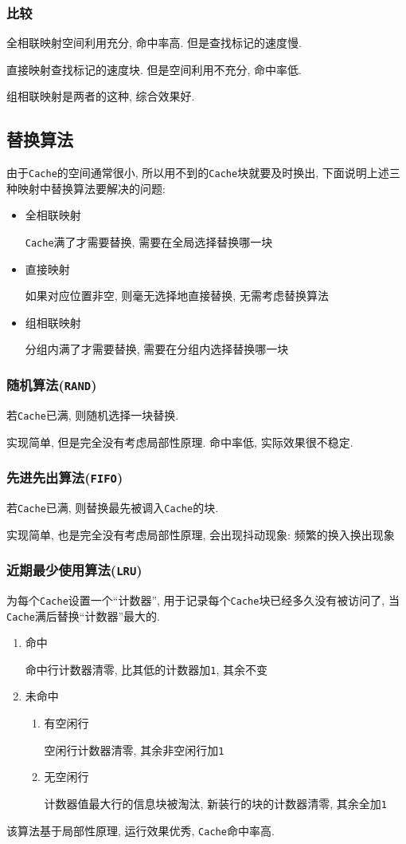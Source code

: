 \subsubsection{比较}
全相联映射空间利用充分, 命中率高. 但是查找标记的速度慢.\par
直接映射查找标记的速度块. 但是空间利用不充分, 命中率低.\par
组相联映射是两者的这种, 综合效果好.
\subsection{替换算法}
由于\verb|Cache|的空间通常很小, 所以用不到的\verb|Cache|块就要及时换出, 下面说明上述三种映射中替换算法要解决的问题:
\begin{itemize}
\item 全相联映射 \par \verb|Cache|满了才需要替换, 需要在全局选择替换哪一块
\item 直接映射 \par 如果对应位置非空, 则毫无选择地直接替换, 无需考虑替换算法
\item 组相联映射 \par 分组内满了才需要替换, 需要在分组内选择替换哪一块
\end{itemize}
\subsubsection{随机算法(\texttt{RAND})}
若\verb|Cache|已满, 则随机选择一块替换. \par
实现简单, 但是完全没有考虑局部性原理. 命中率低, 实际效果很不稳定.
\subsubsection{先进先出算法(\texttt{FIFO})}
若\verb|Cache|已满, 则替换最先被调入\verb|Cache|的块. \par
实现简单, 也是完全没有考虑局部性原理, 会出现抖动现象: 频繁的换入换出现象
\subsubsection{近期最少使用算法(\texttt{LRU})}
为每个\verb|Cache|设置一个``计数器'', 用于记录每个\verb|Cache|块已经多久没有被访问了, 当\verb|Cache|满后替换``计数器''最大的. \par
\begin{enumerate}
\item 命中 \par 命中行计数器清零, 比其低的计数器加\verb|1|, 其余不变
\item 未命中
\begin{enumerate}
\item 有空闲行 \par 空闲行计数器清零, 其余非空闲行加\verb|1|
\item 无空闲行 \par 计数器值最大行的信息块被淘汰, 新装行的块的计数器清零, 其余全加\verb|1|
\end{enumerate}
\end{enumerate}\par
该算法基于局部性原理, 运行效果优秀, \verb|Cache|命中率高.
